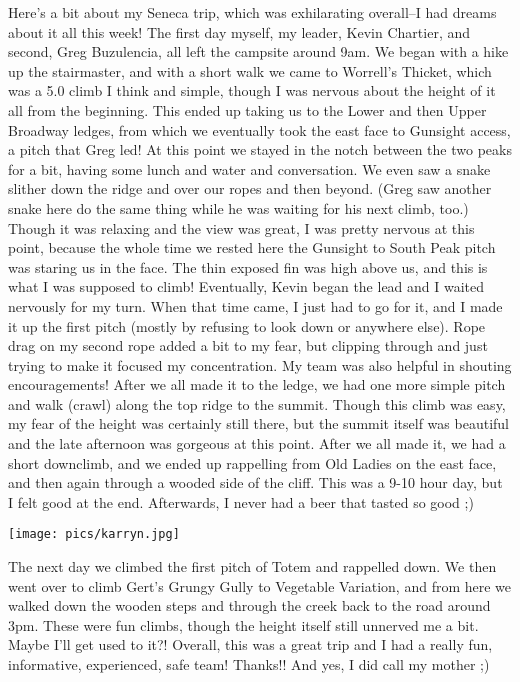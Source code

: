 \documentclass[10pt,a4paper]{article}
\newenvironment{Figure}
  {\par\medskip\noindent\minipage{\linewidth}}
  {\endminipage\par\medskip}
\begin{document}
\begin{multicols}{2}
Here's a bit about my Seneca trip, which was exhilarating overall--I had dreams about it all this week!  The first day myself, my leader, Kevin Chartier, and second, Greg Buzulencia, all left the campsite around 9am.  We began with a hike up the stairmaster, and with a short walk we came to Worrell's Thicket, which was a 5.0 climb I think and simple, though I was nervous about the height of it all from the beginning.  This ended up taking us to the Lower and then Upper Broadway ledges, from which we eventually took the east face to Gunsight access, a pitch that Greg led!  At this point we stayed in the notch between the two peaks for a bit, having some lunch and water and conversation.  We even saw a snake slither down the ridge and over our ropes and then beyond.  (Greg saw another snake here do the same thing while he was waiting for his next climb, too.)  Though it was relaxing and the view was great, I was pretty nervous at this point, because the whole time we rested here the Gunsight to South Peak pitch was staring us in the face.  The thin exposed fin was high above us, and this is what I was supposed to climb!  Eventually, Kevin began the lead and I waited nervously for my turn.  When that time came, I just had to go for it, and I made it up the first pitch (mostly by refusing to look down or anywhere else).  Rope drag on my second rope added a bit to my fear, but clipping through and just trying to make it focused my concentration.  My team was also helpful in shouting encouragements!  After we all made it to the ledge, we had one more simple pitch and walk (crawl) along the top ridge to the summit.  Though this climb was easy, my fear of the height was certainly still there, but the summit itself was beautiful and the late afternoon was gorgeous at this point.  After we all made it, we had a short downclimb, and we ended up rappelling from Old Ladies on the east face, and then again through a wooded side of the cliff.  This was a 9-10 hour day, but I felt good at the end.  Afterwards, I never had a beer that tasted so good ;)  

\begin{Figure}
 \centering
 \texttt{[image: pics/karryn.jpg]}
\end{Figure}


The next day we climbed the first pitch of Totem and rappelled down.  We then went over to climb Gert's Grungy Gully to Vegetable Variation, and from here we walked down the wooden steps and through the creek back to the road around 3pm.  These were fun climbs, though the height itself still unnerved me a bit.  Maybe I'll get used to it?!  Overall, this was a great trip and I had a really fun, informative, experienced, safe team!  Thanks!! And yes, I did call my mother ;)


\end{multicols}
\end{document}
